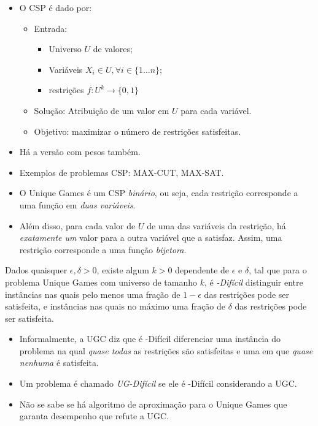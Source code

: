 \documentclass[12pt,a4paper]{article}
\begin{document}
\begin{itemize}
    \item O CSP é dado por:
    \begin{itemize}
        \item Entrada:
            \begin{itemize}
                \item Universo $U$ de valores;
                \item Variáveis $X_i \in U, \forall i \in \{1 \dots n\}$;
                \item restrições $f:U^k \xrightarrow{} \{0,1\}$
            \end{itemize}
        \item Solução: Atribuição de um valor em $U$ para cada variável.
        \item Objetivo: maximizar o número de restrições satisfeitas.
    \end{itemize}
    \item Há a versão com pesos também.
    \item Exemplos de problemas CSP: MAX-CUT, MAX-SAT.
\end{itemize}

\begin{itemize}
    \item O Unique Games é um CSP \emph{binário}, ou seja, cada restrição corresponde a uma função em \emph{duas variáveis}.
    \item Além disso, para cada valor de $U$ de uma das variáveis da restrição, há \emph{exatamente um} valor para a outra variável que a satisfaz. Assim, uma restrição corresponde a uma função \emph{bijetora}.
\end{itemize}

\begin{conjectura}
    Dados quaisquer $\epsilon,\delta>0$, existe algum $k>0$ dependente de  $\epsilon$ e $\delta$, tal que para o problema Unique Games com universo de tamanho $k$, é \emph{\np-Difícil} distinguir entre instâncias nas quais pelo menos uma fração de $1-\epsilon$ das restrições pode ser satisfeita, e instâncias nas quais no máximo uma fração de $\delta$ das restrições pode ser satisfeita.
\end{conjectura}

\begin{itemize}
    \item Informalmente, a UGC diz que é \np-Difícil diferenciar uma instância do problema na qual \emph{quase todas} as restrições são satisfeitas e uma em que \emph{quase nenhuma} é satisfeita.
    \item Um problema é chamado \emph{UG-Difícil} se ele é \np-Difícil considerando a UGC.
    \item Não se sabe se há algoritmo de aproximação para o Unique Games que garanta desempenho que refute a UGC.
\end{itemize}
\end{document}
